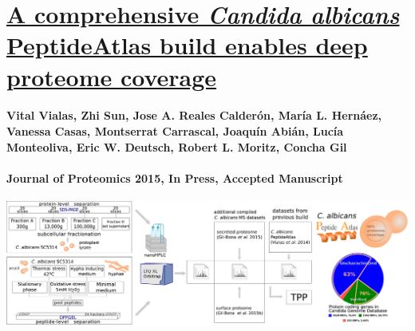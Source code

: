 %
%


\chapter*{\href{http://www.ncbi.nlm.nih.gov/pubmed/26493587}{A comprehensive \textit{Candida albicans} PeptideAtlas build enables deep proteome coverage}}






\subsubsection*{Vital Vialas, Zhi Sun, Jose A. Reales Calder\'on, Mar\'ia L. Hern\'aez, Vanessa Casas, Montserrat Carrascal, Joaqu\'in Abi\'an, Luc\'ia Monteoliva, Eric W. Deutsch, Robert L. Moritz, Concha Gil}
\subsubsection*{Journal of Proteomics 2015, In Press, Accepted Manuscript}

\bigskip
\hfill
\includegraphics[width=1\textwidth]{Imagenes/Vectorial/graphical_abstract_PeptideAtlas2}




